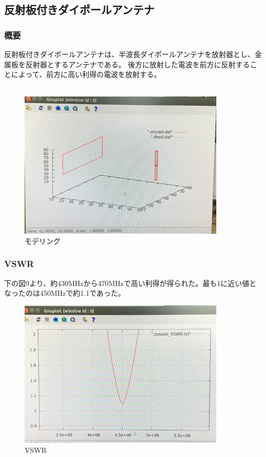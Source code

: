 \documentclass[dvipdfmx,autodetect-engine,titlepage]{jsarticle}
\begin{document}
\subsection{反射板付きダイポールアンテナ}
\subsubsection{概要}
反射板付きダイポールアンテナは、半波長ダイポールアンテナを放射器とし、金属板を反射器とするアンテナである。
後方に放射した電波を前方に反射することによって、前方に高い利得の電波を放射する。\\\\
\begin{figure}[H]
  \centering
  \includegraphics[scale=0.6]{i1.png}
  \caption{モデリング}\label{fig:図10}
\end{figure}

\subsubsection{VSWR}
下の図9より、約430MHzから470MHzで高い利得が得られた。最も1に近い値となったのは450MHzで約1.1であった。\\
\begin{figure}[H]
  \centering
  \includegraphics[scale=0.6]{i2.png}
  \caption{VSWR}\label{fig:図11}
\end{figure}
\end{document}

